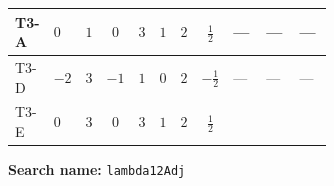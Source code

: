 \documentclass[8pt]{article}
\begin{document}
\begin{landscape}
\begin{longtable}{@{}llcccccc >{\raggedright\arraybackslash}p{0.21\linewidth} >{\raggedright\arraybackslash}p{0.21\linewidth} >{\raggedright\arraybackslash}p{0.21\linewidth}@{}}
\midrule
T3-A & $0$ & $1$ & $0$ & $3$ & $1$ & $2$ & $\frac{1}{2}$ & --- & --- & --- \\
\midrule
T3-D & $-2$ & $3$ & $-1$ & $1$ & $0$ & $2$ & $-\frac{1}{2}$ & --- & --- & --- \\
\midrule
T3-E & $0$ & $3$ & $0$ & $3$ & $1$ & $2$ & $\frac{1}{2}$ & \scriptsize\adjustbox{max width=\linewidth}{$\begin{gathered} +8 {\lambda_{12}} {\lambda_{12}^{\rm Adj}}\end{gathered}$} & \scriptsize\adjustbox{max width=\linewidth}{$\begin{gathered} +2 {\lambda_{12}^{\rm Adj}} {\lambda_{S_1}}\end{gathered}$} & \scriptsize\adjustbox{max width=\linewidth}{$\begin{gathered} +2 {\lambda_{12}^{\rm Adj}} {\lambda_{S_2}}\end{gathered}$} \\
\midrule
\bottomrule
\end{longtable}
\clearpage
\noindent\textbf{Search name: }\texttt{lambda12Adj}\par\smallskip

\end{landscape}
\end{document}
